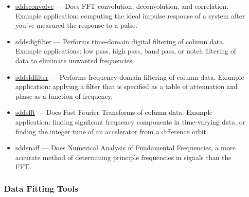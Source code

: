 \documentclass[11pt]{article}
\newcommand{\progref}[1]{\hyperref[#1]{#1}}
\begin{document}
\begin{itemize}

\item \progref{sddsconvolve} --- Does FFT convolution, deconvolution, and correlation. Example
application: computing the ideal impulse response of a system after you've measured the response to
a pulse.

\item \progref{sddsdigfilter} --- Performs time-domain digital filtering of column data.  Example applications:
low pass, high pass, band pass, or notch filtering of data to eliminate unwanted frequencies.

\item \progref{sddsfdfilter} --- Performs frequency-domain filtering of column data.  Example application:
applying a filter that is specified as a table of attenuation and phase as a function of frequency.

\item \progref{sddsfft} --- Does Fast Fourier Transforms of column data.  Example application: finding signficant
frequency components in time-varying data, or finding the integer tune of an accelerator from a difference orbit.

\item \progref{sddsnaff} --- Does Numerical Analysis of Fundamental Frequencies, a more accurate
method of determining principle frequencies in signals than the FFT.

\end{itemize}

\subsubsection{Data Fitting Tools}
\end{document}
